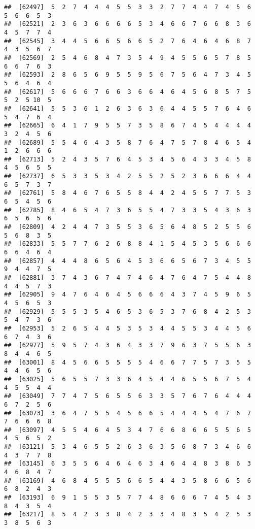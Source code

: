 \documentclass[
]{book}
\begin{document}
\begin{verbatim}
##  [62497]  5  2  7  4  4  4  5  5  3  3  2  7  7  4  4  7  4  5  6  5  6  6  5  3
##  [62521]  2  3  6  3  6  6  6  6  5  3  4  6  6  7  6  6  8  3  6  4  5  7  7  4
##  [62545]  3  4  4  5  6  6  5  6  6  5  2  7  6  4  6  4  6  8  7  4  3  5  6  7
##  [62569]  2  5  4  6  8  4  7  3  5  4  9  4  5  5  6  5  7  8  5  6  6  7  6  3
##  [62593]  2  8  6  5  6  9  5  5  9  5  6  7  5  6  4  7  3  4  5  5  6  4  6  4
##  [62617]  5  6  6  6  7  6  6  3  6  6  4  6  4  5  6  8  5  7  5  5  2  5 10  5
##  [62641]  5  5  3  6  1  2  6  3  6  3  6  4  4  5  5  7  6  4  6  5  4  7  6  4
##  [62665]  6  4  1  7  9  5  5  7  3  5  8  6  7  4  5  4  4  4  4  3  2  4  5  6
##  [62689]  5  5  4  6  4  3  5  8  7  6  4  7  5  7  8  4  6  5  4  1  2  6  6  6
##  [62713]  5  2  4  3  5  7  6  4  5  3  4  5  6  4  3  3  4  5  8  4  5  6  5  5
##  [62737]  6  5  3  3  5  3  4  2  5  5  2  5  2  3  6  6  6  4  4  6  5  7  3  7
##  [62761]  5  8  4  6  7  6  5  5  8  4  4  2  4  5  5  7  7  5  3  6  5  4  5  6
##  [62785]  8  4  6  5  4  7  3  6  5  5  4  7  3  3  5  4  3  6  3  6  5  6  5  6
##  [62809]  4  2  4  4  7  3  5  5  3  6  5  6  4  8  5  2  5  5  6  5  6  8  3  5
##  [62833]  5  5  7  7  6  2  6  8  8  4  1  5  4  5  3  5  6  6  6  6  6  4  6  4
##  [62857]  4  4  4  8  6  5  6  4  5  3  6  6  5  6  7  3  4  5  5  9  4  4  7  5
##  [62881]  3  7  4  3  6  7  4  7  4  6  4  7  6  4  7  5  4  4  8  4  4  5  7  3
##  [62905]  9  4  7  6  4  6  4  5  6  6  6  4  3  7  4  5  9  6  5  4  5  6  5  3
##  [62929]  5  5  5  3  5  4  6  5  3  6  5  3  7  6  8  4  2  5  3  5  4  7  3  6
##  [62953]  5  2  6  5  4  4  5  3  5  3  4  4  5  5  3  4  4  5  6  6  7  4  3  6
##  [62977]  5  9  5  7  4  3  6  4  3  3  7  9  6  3  7  5  5  6  3  8  4  4  6  5
##  [63001]  8  4  5  6  6  5  5  5  5  4  6  6  7  7  5  7  3  5  5  4  4  6  5  6
##  [63025]  5  6  5  5  7  3  3  6  4  5  4  4  6  5  5  6  7  5  4  4  5  5  4  4
##  [63049]  7  7  4  7  5  6  5  5  6  3  3  5  7  6  7  6  4  4  4  6  7  2  5  6
##  [63073]  3  6  4  7  5  5  4  5  6  6  5  4  4  4  5  4  7  6  7  7  6  6  6  8
##  [63097]  4  5  5  4  6  4  5  3  4  7  6  6  8  6  6  5  5  6  5  4  5  6  5  2
##  [63121]  5  3  4  6  5  5  2  6  3  6  3  5  6  8  7  3  4  6  6  4  3  7  7  8
##  [63145]  6  3  5  5  6  4  6  4  6  3  4  6  4  4  8  3  8  6  3  4  6  8  4  7
##  [63169]  4  6  8  4  5  5  5  6  6  5  4  4  3  5  8  6  6  5  6  6  8  2  4  3
##  [63193]  6  9  1  5  5  3  5  7  7  4  8  6  6  6  7  4  5  4  3  8  4  3  5  4
##  [63217]  8  5  4  2  3  3  8  4  2  3  3  4  8  3  5  4  2  5  3  3  8  5  6  3

\end{verbatim}
\end{document}
